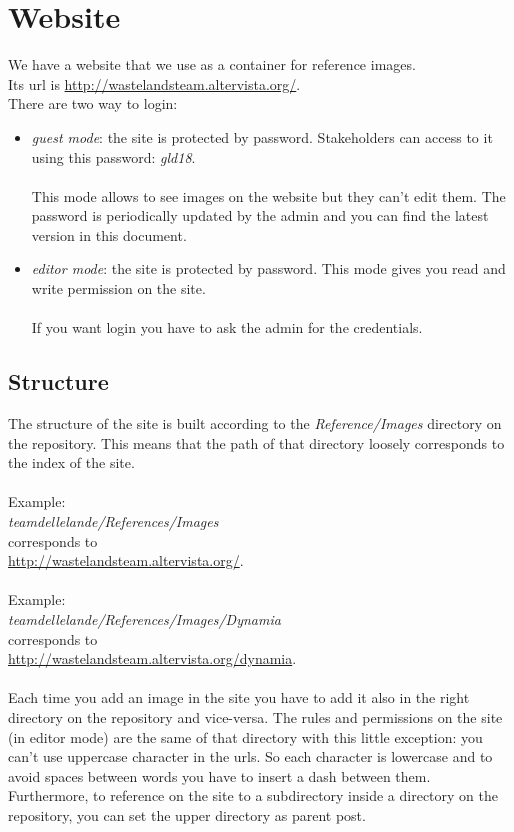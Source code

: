 \section{Website}
We have a website that we use as a container for reference images. \\Its url is \url{http://wastelandsteam.altervista.org/}.\\

There are two way to login: 
\begin{itemize}
\item \textit{guest mode}: the site is protected by password. Stakeholders can access to it using this password: \textit{gld18}.\\\\
  This mode allows to see images on the website but they can't edit them. The password is periodically updated by the admin and you can find the latest version in this document.
\item \textit{editor mode}: the site is protected by password. This mode gives you read and write permission on the site.\\\\
  If you want login you have to ask the admin for the credentials.
\end{itemize}

\subsection{Structure}
The structure of the site is built according to the \textit{Reference/Images} directory on the repository.
This means that the path of that directory loosely corresponds to the index of the site.\\\\
Example: \\
\textit{teamdellelande/References/Images} \\corresponds to\\ \url{http://wastelandsteam.altervista.org/}.\\\\
Example: \\
\textit{teamdellelande/References/Images/Dynamia} \\corresponds to\\ \url{http://wastelandsteam.altervista.org/dynamia}.\\\\
Each time you add an image in the site you have to add it also in the right directory on the repository and vice-versa.
The rules and permissions on the site (in editor mode) are the same of that directory with this little exception:
you can't use uppercase character in the urls. So each character is lowercase and to avoid spaces between words you have to insert a dash between them. Furthermore, to reference on the site to a subdirectory inside a directory on the repository, you can set the upper directory as parent post.
